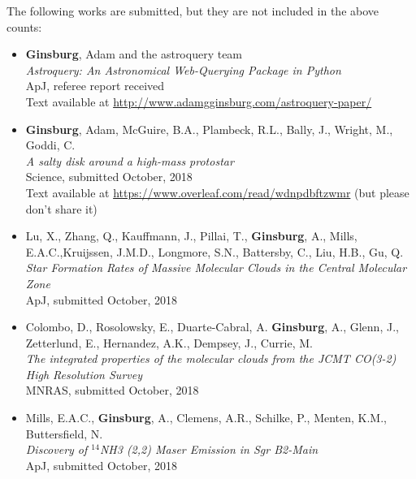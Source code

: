 \vspace{24pt}
The following works are submitted, but they are not included in the above counts:

\begin{itemize}
    \item \textbf{Ginsburg}, Adam and the astroquery team \\
        \textit{Astroquery: An Astronomical Web-Querying Package in Python} \\
ApJ, referee report received \\ 
Text available at \url{http://www.adamgginsburg.com/astroquery-paper/}

    \item \textbf{Ginsburg}, Adam, McGuire, B.A., Plambeck, R.L., Bally, J., Wright, M., Goddi, C. \\
        \textit{A salty disk around a high-mass protostar} \\
Science, submitted October, 2018 \\
Text available at \url{https://www.overleaf.com/read/wdnpdbftzwmr} (but please don't share it)

\item Lu, X., Zhang, Q., Kauffmann, J.,  Pillai, T.,  
    \textbf{Ginsburg}, A.,  Mills, E.A.C.,Kruijssen, J.M.D., 
    Longmore, S.N.,  Battersby, C.,   Liu, H.B.,  Gu, Q. \\
    \textit{Star Formation Rates of Massive Molecular Clouds in the Central Molecular Zone}\\
    ApJ, submitted October, 2018

\item Colombo, D.,   Rosolowsky, E., Duarte-Cabral, A. \textbf{Ginsburg}, A.,
    Glenn, J.,  Zetterlund, E., Hernandez, A.K., Dempsey, J., Currie, M. \\
    \textit{The integrated properties of the molecular clouds from the JCMT CO(3-2) High Resolution Survey} \\
    MNRAS, submitted October, 2018
    
\item Mills, E.A.C., \textbf{Ginsburg}, A., Clemens, A.R., Schilke, P., Menten, K.M., Buttersfield, N. \\
    \textit{Discovery of $^{14}$NH3 (2,2) Maser Emission in Sgr B2-Main} \\
    ApJ, submitted October, 2018

\end{itemize}
